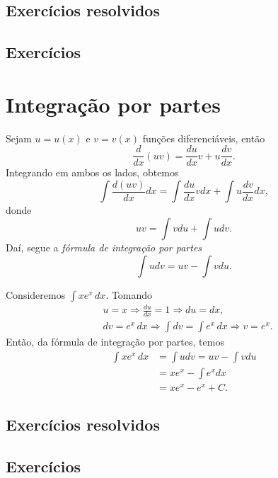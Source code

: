 \subsection*{Exercícios resolvidos}

\emconstrucao

\subsection*{Exercícios}

\emconstrucao

\section{Integração por partes}\label{cap_int_sec_partes}

Sejam $u=u(x)$ e $v=v(x)$ funções diferenciáveis, então
\begin{equation}
  \frac{d}{dx}(uv) = \frac{du}{dx}v + u\frac{dv}{dx}.
\end{equation}
Integrando em ambos os lados, obtemos
\begin{equation}
  \int \frac{d (uv)}{dx}dx = \int \frac{du}{dx}vdx + \int u\frac{dv}{dx}dx,
\end{equation}
donde
\begin{equation}
  uv = \int vdu + \int udv.
\end{equation}
Daí, segue a \emph{fórmula de integração por partes}
\begin{equation}
  \int udv = uv - \int vdu.
\end{equation}

\begin{ex}
  Consideremos $\int xe^x\,dx$. Tomando
  \begin{align}
    &u = x \Rightarrow \frac{du}{dx} = 1 \Rightarrow du = dx,\\
    &dv = e^x\,dx \Rightarrow \int dv = \int e^x\,dx \Rightarrow v = e^x.
  \end{align}
  Então, da fórmula de integração por partes, temos
  \begin{align}
    \int xe^x\,dx &= \int udv = uv - \int vdu\\
                  &= xe^x - \int e^xdx\\
                  &= xe^x - e^x + C.
  \end{align}
\end{ex}

\subsection*{Exercícios resolvidos}

\emconstrucao

\subsection*{Exercícios}

\emconstrucao